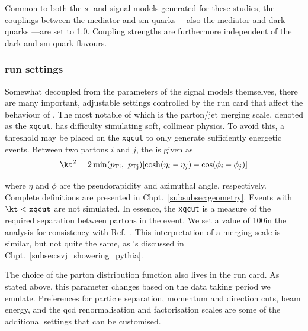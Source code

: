 Common to both the $s$- and \tchannel signal models generated for these studies, the couplings between the mediator and \acrshort{sm} quarks \gq---also the mediator and dark quarks \gqdark---are set to 1.0. Coupling strengths are furthermore independent of the dark and \acrshort{sm} quark flavours.




\subsubsection{\texorpdfstring{\MADGRAPH}{MadGraph} run settings}
\label{subsubsec:svj_mg_run_settings}

Somewhat decoupled from the parameters of the signal models themselves, there are many important, adjustable settings controlled by the run card that affect the behaviour of \MADGRAPH. The most notable of which is the parton/\gls{jet} merging scale, denoted as the \texttt{xqcut}. \MADGRAPH has difficulty simulating soft, collinear physics. To avoid this, a threshold may be placed on the \texttt{xqcut} to only generate sufficiently energetic events. Between two partons $i$ and $j$, the \kt is given as
\begin{equation}
    \kt^2 = 2 \min(p_{\mathrm{Ti}}, \ p_{\mathrm{Tj}}) [\cosh(\eta_i - \eta_j) - \cos(\phi_i - \phi_j)]
    \label{eq:svj_mg_kt}
\end{equation}

where $\eta$ and $\phi$ are the pseudorapidity and azimuthal angle, respectively. Complete definitions are presented in Chpt.~\ref{subsubsec:geometry}. Events with $\kt < \texttt{xqcut}$ are not simulated. In essence, the \texttt{xqcut} is a measure of the required separation between partons in the event. We set a value of 100\GeV in the analysis for consistency with Ref.~. This interpretation of a merging scale is similar, but not quite the same, as \PYTHIA's discussed in Chpt.~\ref{subsec:svj_showering_pythia}.

The choice of the parton distribution function also lives in the run card. As stated above, this parameter changes based on the data taking period we emulate. Preferences for particle separation, momentum and direction cuts, beam energy, and the \acrshort{qcd} renormalisation and factorisation scales are some of the additional settings that can be customised.




